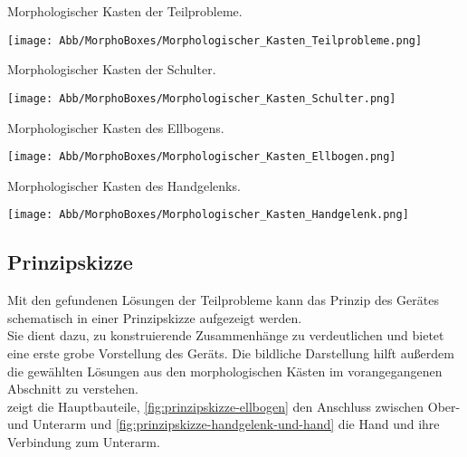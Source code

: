 			\begin{table}[h]
				\centering
				\caption[Morphologischer Kasten der Teilprobleme]{Morphologischer Kasten der Teilprobleme.}
				\texttt{[image: Abb/MorphoBoxes/Morphologischer\_Kasten\_Teilprobleme.png]}\label{tab:morphologische-kasten-teilprobleme}
			\end{table}
%
			\begin{table}[h]
				\centering
				\caption[Morphologischer Kasten der Schulter]{Morphologischer Kasten der Schulter.}
				\texttt{[image: Abb/MorphoBoxes/Morphologischer\_Kasten\_Schulter.png]}\label{tab:morphologische-kasten-schulter}
			\end{table}
%
			\begin{table}[h]
				\centering
				\caption[Morphologischer Kasten des Ellbogens]{Morphologischer Kasten des Ellbogens.}
				\texttt{[image: Abb/MorphoBoxes/Morphologischer\_Kasten\_Ellbogen.png]}\label{tab:morphologische-kasten-ellbogen}
			\end{table}
%
			\begin{table}[h]
				\centering
				\caption[Morphologischer Kasten des Handgelenks]{Morphologischer Kasten des Handgelenks.}
				\texttt{[image: Abb/MorphoBoxes/Morphologischer\_Kasten\_Handgelenk.png]}\label{tab:morphologische-kasten-handgelenk}
			\end{table}
%

		\subsection{Prinzipskizze}
			Mit den gefundenen Lösungen der Teilprobleme kann das Prinzip des Gerätes schematisch in einer Prinzipskizze aufgezeigt werden.\\
			Sie dient dazu, zu konstruierende Zusammenhänge zu verdeutlichen und bietet eine erste grobe Vorstellung des Geräts. Die bildliche Darstellung hilft außerdem die gewählten Lösungen aus den morphologischen Kästen im vorangegangenen Abschnitt zu verstehen.\\
			 zeigt die Hauptbauteile, \cref{fig:prinzipskizze-ellbogen} den Anschluss zwischen Ober- und Unterarm und \cref{fig:prinzipskizze-handgelenk-und-hand} die Hand und ihre Verbindung zum Unterarm.

